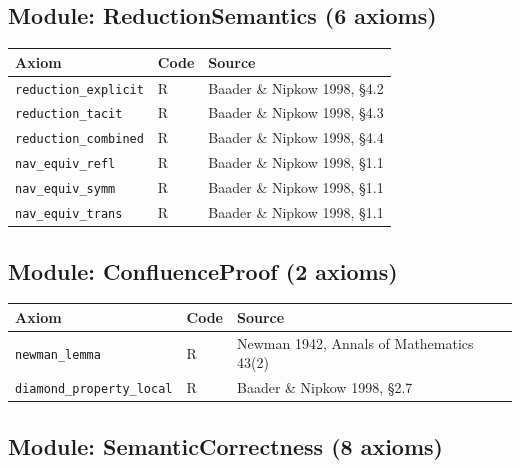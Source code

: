 \subsection*{Module: ReductionSemantics (6 axioms)}

\begin{center}
\begin{tabular}{lll}
\toprule
Axiom & Code & Source \\
\midrule
\texttt{reduction\_explicit} & R & Baader \& Nipkow 1998, §4.2 \\
\texttt{reduction\_tacit} & R & Baader \& Nipkow 1998, §4.3 \\
\texttt{reduction\_combined} & R & Baader \& Nipkow 1998, §4.4 \\
\texttt{nav\_equiv\_refl} & R & Baader \& Nipkow 1998, §1.1 \\
\texttt{nav\_equiv\_symm} & R & Baader \& Nipkow 1998, §1.1 \\
\texttt{nav\_equiv\_trans} & R & Baader \& Nipkow 1998, §1.1 \\
\bottomrule
\end{tabular}
\end{center}

\subsection*{Module: ConfluenceProof (2 axioms)}

\begin{center}
\begin{tabular}{lll}
\toprule
Axiom & Code & Source \\
\midrule
\texttt{newman\_lemma} & R & Newman 1942, Annals of Mathematics 43(2) \\
\texttt{diamond\_property\_local} & R & Baader \& Nipkow 1998, §2.7 \\
\bottomrule
\end{tabular}
\end{center}

\subsection*{Module: SemanticCorrectness (8 axioms)}

